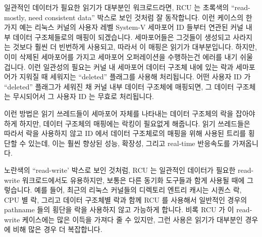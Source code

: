 일관적인 데이터가 필요한 읽기가 대부분인 워크로드라면, RCU 는 초록색의
``read-mostly, need consistent data'' 박스로 보인 것처럼 잘 동작합니다.
이런 케이스의 한가지 예는 리눅스 커널의 사용자 레벨 System-V 세마포어 ID 들부터
연관된 커널 내부 데이터 구조체들로의 매핑이 되겠습니다.
세마포어들은 그것들이 생성되고 사라지는 것보다 훨씬 더 빈번하게 사용되고,
따라서 이 매핑은 읽기가 대부분입니다.
하지만, 이미 삭제된 세마포어를 가지고 세마포어 오퍼레이션을 수행하는건 에러를
내기 쉬울겁니다.
이런 일관성의 필요는 커널 내 세마포어 데이터 구조체 내에 있는 락과 세마포어가
지워질 때 세워지는 ``deleted'' 플래그를 사용해 처리됩니다.
어떤 사용자 ID 가 ``deleted'' 플래그가 세워진 채 커널 내부 데이터 구조체에
매핑되면, 그 데이터 구조체는 무시되어서 그 사용자 ID 는 무효로 처리됩니다.

이런 방법은 읽기 쓰레드들이 세마포어 자체를 나타내는 데이터 구조체의 락을
잡아야 하게 하지만, 데이터 구조체의 매핑에는 락킹이 필요없게 해줍니다.
읽기 쓰레드들은 따라서 락을 사용하지 않고 ID 에서 데이터 구조체로의 매핑을 위해
사용된 트리를 횡단할 수 있는데, 이는 훨씬 향상된 성능, 확장성, 그리고 real-time
반응속도를 가져옵니다.

노란색의 ``read-write' 박스로 보인 것처럼, RCU 는 일관적인 데이터가 필요한
read-write 워크로드에서도 유용하지만, 보통은 다른 동기화 도구들과 함게 사용될
때에 그렇습니다.
예를 들어, 최근의 리눅스 커널들의 디렉토리 엔트리 캐시는 시퀀스 락, CPU 별
락, 그리고 데이터 구조체별 락과 함께 RCU 를 사용해서 일반적인 경우의
pathname 들의 횡단을 락을 사용하지 않고 가능하게 합니다.
비록 RCU 가 이 read-write 케이스에는 많은 이득을 가져다 줄 수 있지만, 그런
사용은 읽기가 대부분인 경우에 비해 많은 경우 더 복잡합니다.
\iffalse

